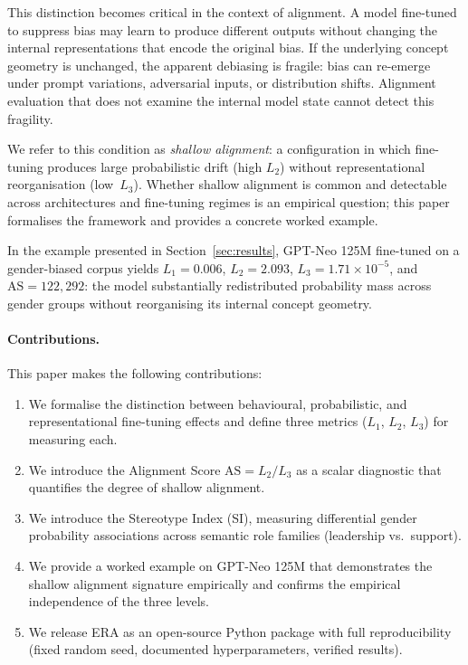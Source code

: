 \documentclass[11pt,a4paper]{article}
\begin{document}
This distinction becomes critical in the context of alignment. A model fine-tuned to suppress
bias may learn to produce different outputs without changing the internal representations
that encode the original bias. If the underlying concept geometry is unchanged, the apparent
debiasing is fragile: bias can re-emerge under prompt variations, adversarial inputs, or
distribution shifts. Alignment evaluation that does not examine the internal model state
cannot detect this fragility.

We refer to this condition as \emph{shallow alignment}: a configuration in which fine-tuning
produces large probabilistic drift (high $L_2$) without representational reorganisation
(low~$L_3$). Whether shallow alignment is common and detectable across architectures and
fine-tuning regimes is an empirical question; this paper formalises the framework and
provides a concrete worked example.

In the example presented in Section~\ref{sec:results}, GPT-Neo 125M fine-tuned on a
gender-biased corpus yields $L_1 = 0.006$, $L_2 = 2.093$, $L_3 = 1.71 \times 10^{-5}$,
and $\mathrm{AS} = 122{,}292$: the model substantially redistributed probability mass across
gender groups without reorganising its internal concept geometry.

\paragraph{Contributions.} This paper makes the following contributions:
\begin{enumerate}
  \item We formalise the distinction between behavioural, probabilistic, and representational
        fine-tuning effects and define three metrics ($L_1$, $L_2$, $L_3$) for measuring each.
  \item We introduce the Alignment Score $\mathrm{AS} = L_2 / L_3$ as a scalar diagnostic
        that quantifies the degree of shallow alignment.
  \item We introduce the Stereotype Index (SI), measuring differential gender probability
        associations across semantic role families (leadership vs.\ support).
  \item We provide a worked example on GPT-Neo 125M that demonstrates the shallow
        alignment signature empirically and confirms the empirical independence of the three levels.
  \item We release ERA as an open-source Python package with full reproducibility (fixed
        random seed, documented hyperparameters, verified results).
\end{enumerate}
\end{document}
